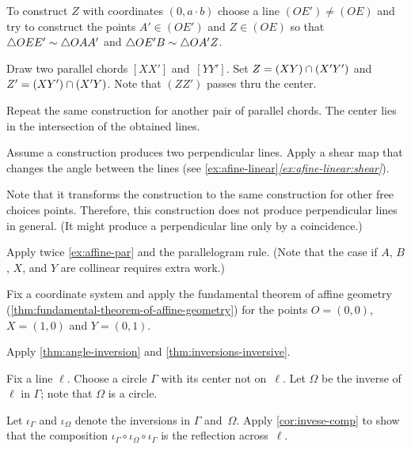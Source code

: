 To construct $Z$ with coordinates $(0,a\cdot b)$
choose a line $(OE')\ne (OE)$
and try to construct the points $A'\in (OE')$
and $Z \in(OE)$
so that 
$\triangle OEE'\z\sim \triangle OAA'$ and $\triangle OE'B\z\sim \triangle OA'Z$.

Draw two parallel chords $[XX']$ and~$[YY']$.
Set $Z\z=(XY)\z\cap (X'Y')$ and $Z'\z= (XY')\cap (X'Y)$.
Note that $(ZZ')$ passes thru the center.

Repeat the same construction for another pair of parallel chords.
The center lies in the intersection of the obtained lines.

Assume a construction produces two perpendicular lines.
Apply a shear map that changes the angle between the lines (see \ref{ex:afine-linear}\textit{\ref{ex:afine-linear:shear}}).

Note that it transforms the construction to the same construction for other free choices points.
Therefore, this construction does not produce perpendicular lines in general.
(It might produce a perpendicular line only by a coincidence.)
 
Apply twice \ref{ex:affine-par} and the parallelogram rule.
(Note that the case if $A$, $B$, $X$, and $Y$ are collinear requires extra work.)
 
Fix a coordinate system and apply the fundamental theorem of affine geometry (\ref{thm:fundamental-theorem-of-affine-geometry}) for the points $O=(0,0)$, $X=(1,0)$ and $Y=(0,1)$.
 
Apply \ref{thm:angle-inversion} and \ref{thm:inversions-inversive}.
 
Fix a line $\ell$.
Choose a circle $\Gamma$ with its center not on~$\ell$.
Let $\Omega$ be the inverse of $\ell$ in $\Gamma$;
note that $\Omega$ is a circle.

Let $\iota_\Gamma$ and $\iota_\Omega$ denote the inversions in $\Gamma$ and~$\Omega$.
Apply \ref{cor:invese-comp} to show that the composition 
$\iota_\Gamma\circ\iota_\Omega\circ\iota_\Gamma$
is the reflection across~$\ell$.

\setcounter{eqtn}{0}

